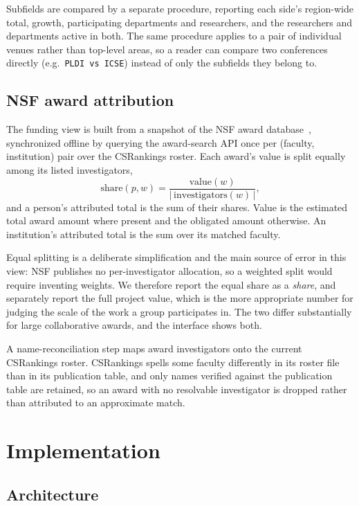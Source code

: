 \documentclass[11pt]{article}
\newcommand{\csr}{CSRankings}
\begin{document}
Subfields are compared by a separate procedure, reporting each side's
region-wide total, growth, participating departments and researchers, and the
researchers and departments active in both. The same procedure applies to a
pair of individual venues rather than top-level areas, so a reader can compare
two conferences directly (e.g.\ \texttt{PLDI vs ICSE}) instead of only the
subfields they belong to.

\subsection{NSF award attribution}
\label{sec:nsfmethod}

The funding view is built from a snapshot of the NSF award
database~\cite{nsfawards}, synchronized offline by querying the award-search
API once per (faculty, institution) pair over the \csr{} roster. Each award's
value is split equally among its listed investigators,
\begin{equation}
  \text{share}(p, w) = \frac{\text{value}(w)}{|\,\text{investigators}(w)\,|},
\end{equation}
and a person's attributed total is the sum of their shares. Value is the
estimated total award amount where present and the obligated amount otherwise.
An institution's attributed total is the sum over its matched faculty.

Equal splitting is a deliberate simplification and the main source of error in
this view: NSF publishes no per-investigator allocation, so a weighted split
would require inventing weights. We therefore report the equal share as a
\emph{share}, and separately report the full project value, which is the more
appropriate number for judging the scale of the work a group participates in.
The two differ substantially for large collaborative awards, and the interface
shows both.

A name-reconciliation step maps award investigators onto the current \csr{}
roster. \csr{} spells some faculty differently in its roster file than in its
publication table, and only names verified against the publication table are
retained, so an award with no resolvable investigator is dropped rather than
attributed to an approximate match.

\section{Implementation}
\label{sec:implementation}

\subsection{Architecture}
\end{document}
